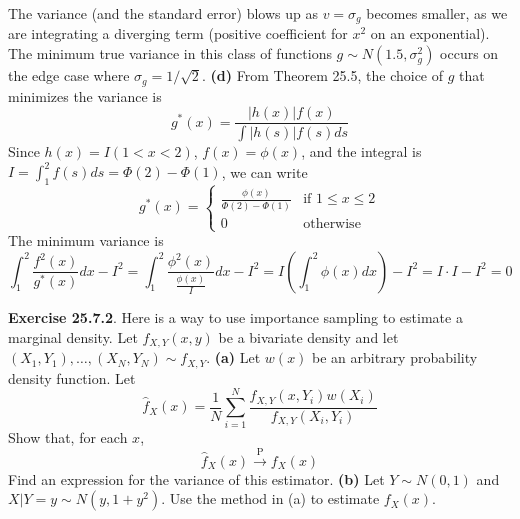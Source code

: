 The variance (and the standard error) blows up as \(v = \sigma_g\)
becomes smaller, as we are integrating a diverging term (positive
coefficient for \(x^{2}\) on an exponential).
The minimum true variance in this class of functions
\(g \sim N(1.5, \sigma_g^{2})\) occurs on the edge case where
\(\sigma_g = 1 / \sqrt{2}\).
\textbf{(d)} From Theorem 25.5, the choice of \(g\) that minimizes the
variance is
\[
g^{*}(x) = \frac{|h(x)| f(x) }{\int | h(s) | f(s)  ds}
\]
Since \(h(x) = I(1 < x < 2)\), \(f(x) = \phi(x)\), and the integral is
\(I = \int_{1}^{2} f(s) ds = \Phi(2) - \Phi(1)\), we can write
\[
g^{*}(x) = \begin{cases}
\frac{\phi(x)}{\Phi(2) - \Phi(1)} &\text{if } 1 \leq x \leq 2 \\
0 &\text{otherwise }
\end{cases}
\]
The minimum variance is
\[
\int_{1}^{2} \frac{f^{2}(x)}{g^{*}(x)} dx - I^{2} = \int_{1}^{2} \frac{\phi^{2}(x)}{\frac{\phi(x)}{I}} dx - I^{2} = I \left( \int_{1}^{2} \phi(x) dx \right) - I^{2} = I \cdot I - I^{2} = 0
\]

\textbf{Exercise 25.7.2}. Here is a way to use importance sampling to
estimate a marginal density. Let \(f_{X, Y}(x, y)\) be a bivariate
density and let \((X_{1}, Y_{1}), \dots, (X_N, Y_N) \sim f_{X, Y}\).
\textbf{(a)} Let \(w(x)\) be an arbitrary probability density function.
Let
\[
\hat{f}_X(x) = \frac{1}{N} \sum_{i=1}^N \frac{f_{X, Y}(x, Y_{i})  w(X_{i})}{f_{X, Y}(X_{i}, Y_{i})}
\]
Show that, for each \(x\),
\[
\hat{f}_X(x) \xrightarrow{\textrm{P}} f_X(x)
\]
Find an expression for the variance of this estimator.
\textbf{(b)} Let \(Y \sim N(0, 1)\) and
\(X | Y = y \sim N(y, 1 + y^{2})\). Use the method in (a) to estimate
\(f_X(x)\).

